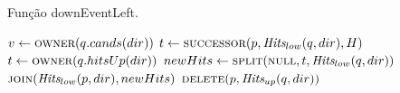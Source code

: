 \begin{algorithm}[H]
    \caption[Algoritmo \textsc{downEventLeft} do par mais próximo cinético]{Função downEventLeft.} \label{alg:par-cinetico:eventodowncaso1}
    \begin{algorithmic}[1]
            \State $v \leftarrow \Call{owner}{q.cands(dir)}$
                \State {}
            \EndIf
            \State {}
            \State $t \leftarrow \Call{successor}{p, \Hits_{low}(q, dir), H}$
                \State $t \leftarrow \Call{owner}{q.hitsUp(dir)}$
            \EndIf
            \State $newHits \leftarrow \Call{split}{\nnull, t, \Hits_{low}(q, dir)}$
            \State $\Call{join}{\Hits_{low}(p, dir), newHits}$
            \State $\Call{delete}{p, \Hits_{up}(q, dir)}$
                \State {}
            \EndIf
        \EndFunction
    \end{algorithmic}
\end{algorithm}
